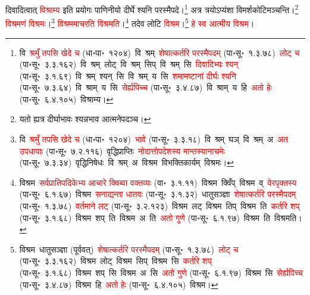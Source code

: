 \fontsize{14}{21}\selectfont\begin{sloppypar}\justifying\noindent\hspace{10mm} दिवादित्वात् \textcolor{red}{विश्राम्य} इति प्रयोगः पाणिनीयो दीर्घे श्यनि परस्मैपदे।\footnote{वि~\textcolor{red}{श्रमुँ तपसि खेदे च} (धा॰पा॰~१२०४)~\arrow वि~श्रम्~\arrow \textcolor{red}{शेषात्कर्तरि परस्मैपदम्} (पा॰सू॰~१.३.७८)~\arrow \textcolor{red}{लोट् च} (पा॰सू॰~३.३.१६२)~\arrow वि~श्रम्~लोट्~\arrow वि~श्रम्~सिप्~\arrow वि~श्रम्~सि~\arrow \textcolor{red}{दिवादिभ्यः श्यन्‌} (पा॰सू॰~३.१.६९)~\arrow वि~श्रम्~श्यन्~सि~\arrow वि~श्रम्~य~सि~\arrow \textcolor{red}{शमामष्टानां दीर्घः श्यनि} (पा॰सू॰~७.३.६४)~\arrow वि~श्राम्~य~सि~\arrow \textcolor{red}{सेर्ह्यपिच्च} (पा॰सू॰~३.४.८७)~\arrow वि~श्राम्~य~हि~\arrow \textcolor{red}{अतो हेः} (पा॰सू॰~६.४.१०५)~\arrow विश्राम्य।} अत्र त्रयोऽप्यंशा विमर्श\-कोटिमञ्चन्ति।\footnote{यतो ह्यत्र दीर्घाभावः श्यन्नभाव आत्मनेपदञ्च।} \textcolor{red}{विश्रमणं विश्रमः}।\footnote{वि~\textcolor{red}{श्रमुँ तपसि खेदे च} (धा॰पा॰~१२०४)~\arrow \textcolor{red}{भावे} (पा॰सू॰~३.३.१८)~\arrow वि~श्रम्~घञ्~\arrow वि~श्रम्~अ~\arrow \textcolor{red}{अत उपधायाः} (पा॰सू॰~७.२.११६)~\arrow वृद्धिप्राप्तिः~\arrow \textcolor{red}{नोदात्तोपदेशस्य मान्तस्यानाचमेः} (पा॰सू॰~७.३.३४)~\arrow वृद्धिनिषेधः~\arrow वि~श्रम्~अ~\arrow विश्रम~\arrow विभक्तिकार्यम्~\arrow विश्रमः।} \textcolor{red}{विश्रममाचरति विश्रमति}।\footnote{विश्रम~\arrow \textcolor{red}{सर्वप्राति\-पदिकेभ्य आचारे क्विब्वा वक्तव्यः} (वा॰~३.१.११)~\arrow विश्रम~क्विँप्~\arrow विश्रम~व्~\arrow \textcolor{red}{वेरपृक्तस्य} (पा॰सू॰~६.१.६७)~\arrow विश्रम~\arrow \textcolor{red}{सनाद्यन्ता धातवः} (पा॰सू॰~३.१.३२)~\arrow धातुसञ्ज्ञा~\arrow \textcolor{red}{शेषात्कर्तरि परस्मैपदम्} (पा॰सू॰~१.३.७८)~\arrow \textcolor{red}{वर्तमाने लट्} (पा॰सू॰~३.२.१२३)~\arrow विश्रम~लट्~\arrow विश्रम~तिप्~\arrow विश्रम~ति~\arrow \textcolor{red}{कर्तरि शप्‌} (पा॰सू॰~३.१.६८)~\arrow विश्रम~शप्~ति~\arrow विश्रम~अ~ति~\arrow \textcolor{red}{अतो गुणे} (पा॰सू॰~६.१.९७)~\arrow विश्रम~ति~\arrow विश्रमति।} तदेव लोटि \textcolor{red}{विश्रम}।\footnote{विश्रम~\arrow धातुसञ्ज्ञा (पूर्ववत्)~\arrow \textcolor{red}{शेषात्कर्तरि परस्मैपदम्} (पा॰सू॰~१.३.७८)~\arrow \textcolor{red}{लोट् च} (पा॰सू॰~३.३.१६२)~\arrow विश्रम~लोट्~\arrow विश्रम~सिप्~\arrow विश्रम~सि~\arrow \textcolor{red}{कर्तरि शप्‌} (पा॰सू॰~३.१.६८)~\arrow विश्रम~शप्~सि~\arrow विश्रम~अ~सि~\arrow \textcolor{red}{अतो गुणे} (पा॰सू॰~६.१.९७)~\arrow विश्रम~सि~\arrow \textcolor{red}{सेर्ह्यपिच्च} (पा॰सू॰~३.४.८७)~\arrow विश्रम~हि~\arrow \textcolor{red}{अतो हेः} (पा॰सू॰~६.४.१०५)~\arrow विश्रम।} \textcolor{red}{हे स्व आत्मीय विश्रम}।\end{sloppypar}
